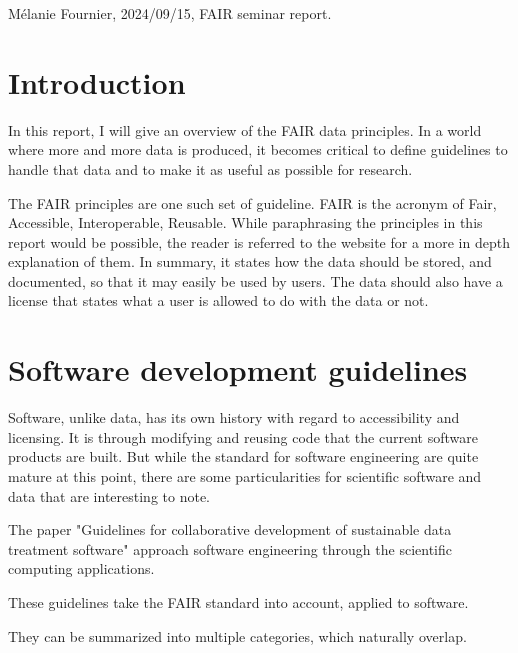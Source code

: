 \documentclass{article}
\begin{document}
Mélanie Fournier, 2024/09/15, FAIR seminar report.


\section{Introduction}

In this report, I will give an overview of the FAIR data principles. In a world where more and more data is produced, it becomes critical to define guidelines to handle that data and to make it as useful as possible for research. 

The FAIR principles are one such set of guideline. FAIR is the acronym of Fair, Accessible, Interoperable, Reusable. While paraphrasing the principles in this report would be possible, the reader is referred to the website for a more in depth explanation of them. In summary, it states how the data should be stored, and documented, so that it may easily be used by users. The data should also have a license that states what a user is allowed to do with the data or not. 



\section{Software development guidelines}

Software, unlike data, has its own history with regard to accessibility and licensing. It is through modifying and reusing code that the current software products are built. But while the standard for software engineering are quite mature at this point, there are some particularities for scientific software and data that are interesting to note. 

The paper "Guidelines for collaborative development of sustainable data treatment software" approach software engineering through the scientific computing applications. 

These guidelines take the FAIR standard into account, applied to software.

They can be summarized into multiple categories, which naturally overlap.
\end{document}
